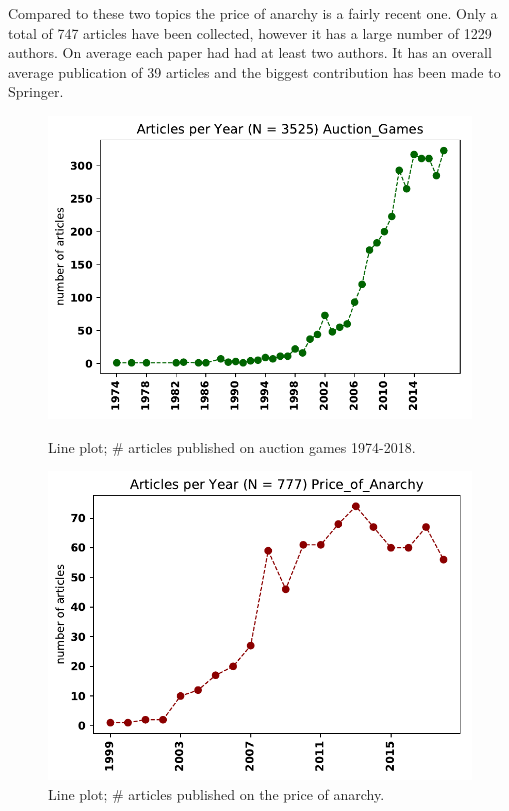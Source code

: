 \documentclass{article}
\theoremstyle{definition}
\begin{document}
Compared to these two topics the price of anarchy is a fairly recent one. Only a
total of 747 articles have been collected, however it has a large number
of 1229 authors. On average each paper had had at least two authors.
It has an overall average publication of 39 articles and the biggest contribution
has been made to Springer.

\begin{figure}[!hbtp]
    \begin{minipage}{.45\textwidth}
        \centering
        \includegraphics[width=\textwidth]{./assets/images/Auction_Games.pdf}
        \caption{Line plot; \# articles published on auction games 1974-2018.}\label{fig:timeseries_ag}
    \end{minipage}%
    \begin{minipage}{.45\textwidth}
        \centering
        \includegraphics[width=\textwidth]{./assets/images/Price_of_Anarchy.pdf}
        \caption{Line plot; \# articles published on the price of anarchy.}\label{fig:timeseries_pa}
    \end{minipage}
    \end{figure}
\end{document}
